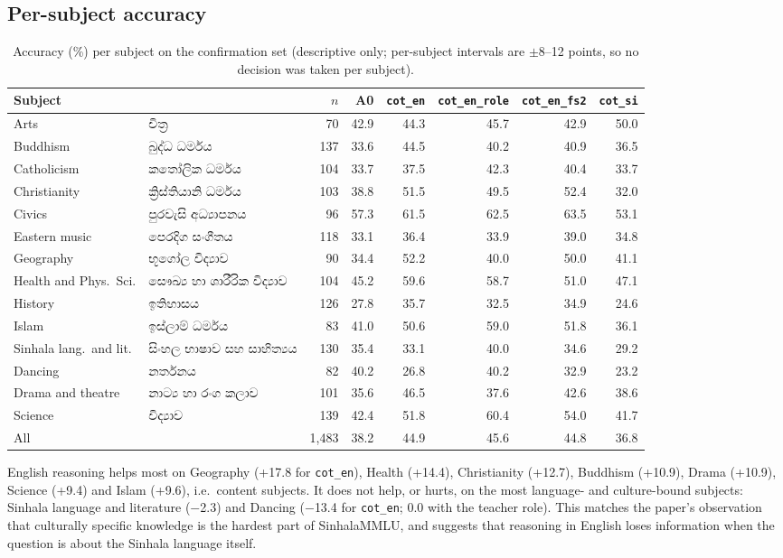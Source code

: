 \documentclass[10pt,a4paper]{article}
\newcommand{\si}[1]{{\sinhalafont #1}}
\newcommand{\cond}[1]{\texttt{#1}}
\begin{document}
\subsection{Per-subject accuracy}
\begin{table}[h]
\centering\footnotesize\setlength{\tabcolsep}{4pt}
\begin{tabular}{llrrrrrr}
\toprule
Subject & & $n$ & A0 & \cond{cot\_en} & \cond{cot\_en\_role} & \cond{cot\_en\_fs2} & \cond{cot\_si}\\
\midrule
Arts & \si{චිත්‍ර} & 70 & 42.9 & 44.3 & 45.7 & 42.9 & 50.0\\
Buddhism & \si{බුද්ධ ධර්මය} & 137 & 33.6 & 44.5 & 40.2 & 40.9 & 36.5\\
Catholicism & \si{කතෝලික ධර්මය} & 104 & 33.7 & 37.5 & 42.3 & 40.4 & 33.7\\
Christianity & \si{ක්‍රිස්තියානි ධර්මය} & 103 & 38.8 & 51.5 & 49.5 & 52.4 & 32.0\\
Civics & \si{පුරවැසි අධ්‍යාපනය} & 96 & 57.3 & 61.5 & 62.5 & 63.5 & 53.1\\
Eastern music & \si{පෙරදිග සංගීතය} & 118 & 33.1 & 36.4 & 33.9 & 39.0 & 34.8\\
Geography & \si{භූගෝල විද්‍යාව} & 90 & 34.4 & 52.2 & 40.0 & 50.0 & 41.1\\
Health and Phys.\ Sci. & \si{සෞඛ්‍ය හා ශාරීරික විද්‍යාව} & 104 & 45.2 & 59.6 & 58.7 & 51.0 & 47.1\\
History & \si{ඉතිහාසය} & 126 & 27.8 & 35.7 & 32.5 & 34.9 & 24.6\\
Islam & \si{ඉස්ලාම් ධර්මය} & 83 & 41.0 & 50.6 & 59.0 & 51.8 & 36.1\\
Sinhala lang.\ and lit. & \si{සිංහල භාෂාව සහ සාහිත්‍යය} & 130 & 35.4 & 33.1 & 40.0 & 34.6 & 29.2\\
Dancing & \si{නර්තනය} & 82 & 40.2 & 26.8 & 40.2 & 32.9 & 23.2\\
Drama and theatre & \si{නාට්‍ය හා රංග කලාව} & 101 & 35.6 & 46.5 & 37.6 & 42.6 & 38.6\\
Science & \si{විද්‍යාව} & 139 & 42.4 & 51.8 & 60.4 & 54.0 & 41.7\\
\midrule
All & & 1,483 & 38.2 & 44.9 & 45.6 & 44.8 & 36.8\\
\bottomrule
\end{tabular}
\caption{Accuracy (\%) per subject on the confirmation set (descriptive only; per-subject intervals are $\pm$8--12
points, so no decision was taken per subject).}
\label{tab:subjects}
\end{table}

English reasoning helps most on Geography (+17.8 for \cond{cot\_en}), Health (+14.4), Christianity (+12.7),
Buddhism (+10.9), Drama (+10.9), Science (+9.4) and Islam (+9.6), i.e.\ content subjects. It does not help, or hurts,
on the most language- and culture-bound subjects: Sinhala language and literature ($-$2.3) and Dancing ($-$13.4 for
\cond{cot\_en}; 0.0 with the teacher role). This matches the paper's observation that culturally specific
knowledge is the hardest part of SinhalaMMLU, and suggests that reasoning in English loses information when the
question is about the Sinhala language itself.
\end{document}
